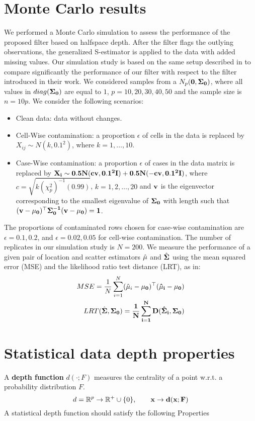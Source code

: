 \documentclass[a4paper,12pt]{article}
\begin{document}
\section{Monte Carlo results}
We performed a Monte Carlo simulation to assess the performance of the proposed filter based on halfspace depth. After the filter flags the outlying observations, the generalized S-estimator is applied to the data with added missing values. Our simulation study is based on the same setup described in \citet{Zamar2017} to compare significantly the performance of our filter with respect to the filter introduced in their work.
We considered samples from a $N_p(\bf{0}, \bf{\Sigma}_0)$, where all values in  $diag(\bf{\Sigma}_0)$ are equal to $1$, $p = 10, 20, 30, 40, 50$ and the sample size is $n = 10p$. We consider the following scenarios:
\begin{itemize}
\item Clean data: data without changes.
\item Cell-Wise contamination: a proportion $\epsilon$ of cells in the data is replaced by $X_{ij} \sim N(k,0.1^2)$, where $k = 1, \ldots, 10$.
\item Case-Wise contamination: a proportion $\epsilon$ of cases in the data matrix is replaced by $\bf{X}_i \sim 0.5N(c\bf{v},0.1^2\bf{I}) + 0.5N(-c\bf{v},0.1^2\bf{I})$, where $c = \sqrt{k(\chi^2_p)^{-1}(0.99)}$, $k = 1, 2, \ldots,20$ and $\bf{v}$ is the eigenvector corresponding to the smallest eigenvalue of $\bf{\Sigma}_0$ with length such that $(\bf{v}-\bf{\mu}_0)^\top\bf{\Sigma}_0^{-1}(\bf{v}-\bf{\mu}_0) = 1$.
\end{itemize}
The proportions of contaminated rows chosen for case-wise contamination are $\epsilon = 0.1, 0.2$, and $\epsilon = 0.02,0.05$ for cell-wise contamination. The number of replicates in our simulation study is $N=200$.
We measure the performance of a given pair of location and scatter estimators $\hat{\bf{\mu}}$ and $\hat{\bf{\Sigma}}$ using the mean squared error (MSE) and the likelihood ratio test distance (LRT), as in:
\begin{align*}
 MSE = \frac{1}{N}\sum_{i=1}^N (\hat{\bf{\mu}}_i - \bf{\mu}_0)^\top (\hat{\bf{\mu}}_i - \bf{\mu}_0) \\  
 LRT(\hat{\bf{\Sigma}},\bf{\Sigma}_0) = \frac{1}{N}\sum_{i=1}^N D(\hat{\bf{\Sigma}}_i,\bf{\Sigma}_0)
\end{align*}
\section{Statistical data depth properties}
A \textbf{depth function} $d(\cdot; F)$ measures the centrality of a point w.r.t. a probability distribution $F$. 
\begin{equation*}
d = \mathbb{R}^{p} \rightarrow \mathbb{R}^+ \cup \{ 0 \}, \qquad \bf{x} \rightarrow d(\bf{x}; F)
\end{equation*}
A statistical depth function should satisfy the following Properties
\end{document}
